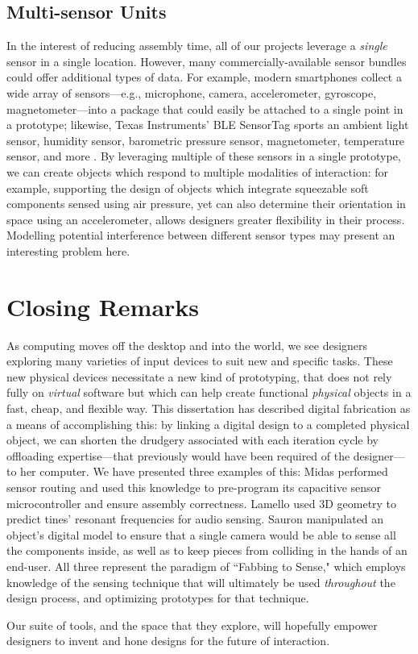 \subsection{Multi-sensor Units}

In the interest of reducing assembly time, all of our projects leverage a \emph{single} sensor in a single location. However, many commercially-available sensor bundles could offer additional types of data. For example, modern smartphones collect a wide array of sensors---e.g., microphone, camera, accelerometer, gyroscope, magnetometer---into a package that could easily be attached to a single point in a prototype; likewise, Texas Instruments' BLE SensorTag sports an ambient light sensor, humidity sensor, barometric pressure sensor, magnetometer, temperature sensor, and more \cite{ti-sensortag}. By leveraging multiple of these sensors in a single prototype, we can create objects which respond to multiple modalities of interaction: for example, supporting the design of objects which integrate squeezable soft components sensed using air pressure, yet can also determine their orientation in space using an accelerometer, allows designers greater flexibility in their process. Modelling potential interference between different sensor types may present an interesting problem here.

\section{Closing Remarks}

As computing moves off the desktop and into the world, we see designers exploring many varieties of input devices to suit new and specific tasks. These new physical devices necessitate a new kind of prototyping, that does not rely fully on \emph{virtual} software but which can help create functional \emph{physical} objects in a fast, cheap, and flexible way. This dissertation has described digital fabrication as a means of accomplishing this: by linking a digital design to a completed physical object, we can shorten the drudgery associated with each iteration cycle by offloading expertise---that previously would have been required of the designer---to her computer. We have presented three examples of this: Midas performed sensor routing and used this knowledge to pre-program its capacitive sensor microcontroller and ensure assembly correctness. Lamello used 3D geometry to predict tines' resonant frequencies for audio sensing. Sauron manipulated an object's digital model to ensure that a single camera would be able to sense all the components inside, as well as to keep pieces from colliding in the hands of an end-user. All three represent the paradigm of ``Fabbing to Sense," which employs knowledge of the sensing technique that will ultimately be used \emph{throughout} the design process, and optimizing prototypes for that technique.

Our suite of tools, and the space that they explore, will hopefully empower designers to invent and hone designs for the future of interaction.
